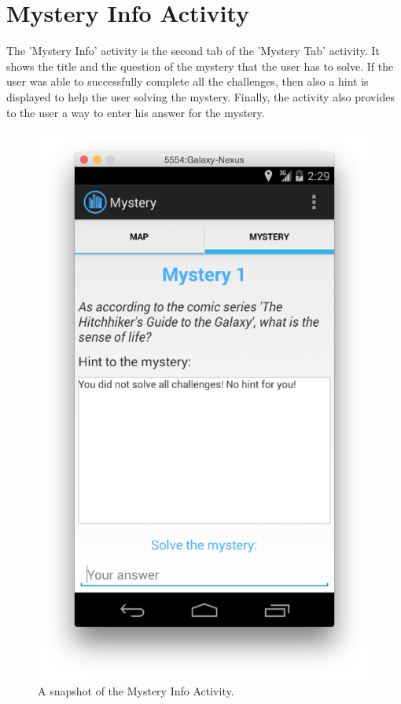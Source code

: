 \section{Mystery Info Activity}

The 'Mystery Info' activity is the second tab of the 'Mystery Tab' activity. It shows the title and the question of the mystery that the user has to solve. If the user was able to successfully complete all the challenges, then also a hint is displayed to help the user solving the mystery. Finally, the activity also provides to the user a way to enter his answer for the mystery.

\begin{figure}[H]
	\centering
	\includegraphics[scale=0.4]{Figures/MysteryInfoActivity}
	\caption{A snapshot of the Mystery Info Activity.}
\end{figure}

